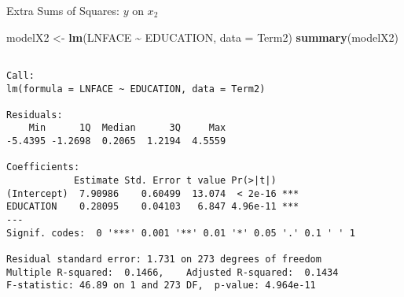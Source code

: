 \documentclass[
  ignorenonframetext,
]{beamer}
\newenvironment{Shaded}{\begin{snugshade}}{\end{snugshade}}
\newcommand{\AttributeTok}[1]{\textcolor[rgb]{0.13,0.29,0.53}{#1}}
\newcommand{\FunctionTok}[1]{\textcolor[rgb]{0.13,0.29,0.53}{\textbf{#1}}}
\newcommand{\NormalTok}[1]{#1}
\newcommand{\OtherTok}[1]{\textcolor[rgb]{0.56,0.35,0.01}{#1}}
\newcommand{\SpecialCharTok}[1]{\textcolor[rgb]{0.81,0.36,0.00}{\textbf{#1}}}
\begin{document}
\begin{frame}[fragile]{Extra Sums of Squares: \(y\) on \(x_2\)}
\protect\hypertarget{extra-sums-of-squares-y-on-x_2}{}
\footnotesize

\begin{Shaded}
\begin{Highlighting}[]
\NormalTok{modelX2 }\OtherTok{\textless{}{-}} \FunctionTok{lm}\NormalTok{(LNFACE }\SpecialCharTok{\textasciitilde{}}\NormalTok{ EDUCATION, }\AttributeTok{data =}\NormalTok{ Term2)}
\FunctionTok{summary}\NormalTok{(modelX2)}
\end{Highlighting}
\end{Shaded}

\begin{verbatim}

Call:
lm(formula = LNFACE ~ EDUCATION, data = Term2)

Residuals:
    Min      1Q  Median      3Q     Max 
-5.4395 -1.2698  0.2065  1.2194  4.5559 

Coefficients:
            Estimate Std. Error t value Pr(>|t|)    
(Intercept)  7.90986    0.60499  13.074  < 2e-16 ***
EDUCATION    0.28095    0.04103   6.847 4.96e-11 ***
---
Signif. codes:  0 '***' 0.001 '**' 0.01 '*' 0.05 '.' 0.1 ' ' 1

Residual standard error: 1.731 on 273 degrees of freedom
Multiple R-squared:  0.1466,    Adjusted R-squared:  0.1434 
F-statistic: 46.89 on 1 and 273 DF,  p-value: 4.964e-11
\end{verbatim}

\normalsize
\end{frame}
\end{document}
